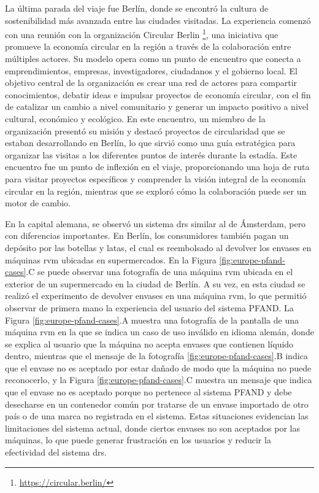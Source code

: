La última parada del viaje fue Berlín, donde se encontró la cultura de sostenibilidad más avanzada entre las ciudades visitadas. La experiencia comenzó con una reunión con la organización Circular Berlin \footnote{\url{https://circular.berlin/}}, una iniciativa que promueve la economía circular en la región a través de la colaboración entre múltiples actores. Su modelo opera como un punto de encuentro que conecta a emprendimientos, empresas, investigadores, ciudadanos y el gobierno local. El objetivo central de la organización es crear una red de actores para compartir conocimientos, debatir ideas e impulsar proyectos de economía circular, con el fin de catalizar un cambio a nivel comunitario y generar un impacto positivo a nivel cultural, económico y ecológico. En este encuentro, un miembro de la organización presentó su misión y destacó proyectos de circularidad que se estaban desarrollando en Berlín, lo que sirvió como una guía estratégica para organizar las visitas a los diferentes puntos de interés durante la estadía. Este encuentro fue un punto de inflexión en el viaje, proporcionando una hoja de ruta para visitar proyectos específicos y comprender la visión integral de la economía circular en la región, mientras que se exploró cómo la colaboración puede ser un motor de cambio.

En la capital alemana, se observó un sistema \acrshort{drs} similar al de Ámsterdam, pero con diferencias importantes. En Berlín, los consumidores también pagan un depósito por las botellas y latas, el cual es reembolsado al devolver los envases en máquinas \acrshort{rvm} ubicadas en supermercados. En la Figura \ref{fig:europe-pfand-cases}.C se puede observar una fotografía de una máquina \acrshort{rvm} ubicada en el exterior de un supermercado en la ciudad de Berlín. A su vez, en esta ciudad se realizó el experimento de devolver envases en una máquina \acrshort{rvm}, lo que permitió observar de primera mano la experiencia del usuario del sistema PFAND. La Figura \ref{fig:europe-pfand-cases}.A muestra una fotografía de la pantalla de una máquina \acrshort{rvm} en la que se indica un caso de uso inválido en idioma alemán, donde se explica al usuario que la máquina no acepta envases que contienen líquido dentro, mientras que el mensaje de la fotografía \ref{fig:europe-pfand-cases}.B indica que el envase no es aceptado por estar dañado de modo que la máquina no puede reconocerlo, y la Figura \ref{fig:europe-pfand-cases}.C muestra un mensaje que indica que el envase no es aceptado porque no pertenece al sistema PFAND y debe desecharse en un contenedor común por tratarse de un envase importado de otro país o de una marca no registrada en el sistema. Estas situaciones evidencian las limitaciones del sistema actual, donde ciertos envases no son aceptados por las máquinas, lo que puede generar frustración en los usuarios y reducir la efectividad del sistema \acrshort{drs}. 

